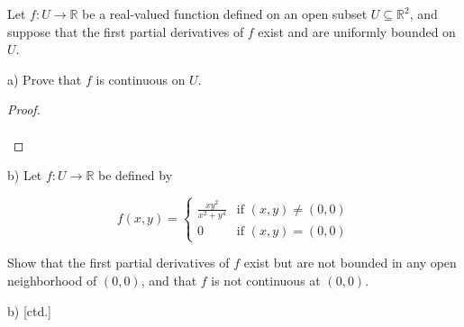 Let $f:U \to \mathbb{R}$ be a real-valued function defined on an open subset $U \subseteq \mathbb{R}^2$, and suppose
that the first partial derivatives of $f$ exist and are uniformly bounded on $U$.

a) Prove that $f$ is continuous on $U$.

\begin{proof}\renewcommand{\qedsymbol}{}\ \\\\
\end{proof}

\pagebreak

b) Let $f:U \to \mathbb{R}$ be defined by 

   $$
   f(x, y) = \begin{cases}
     \frac{xy^2}{x^2 + y^4} &\text{if } (x, y) \neq (0, 0) \\
     0                      &\text{if } (x, y) = (0, 0)
   \end{cases} 
   $$

   Show that the first partial derivatives of $f$ exist but are not bounded in any open neighborhood of $(0, 0)$, and
   that $f$ is not continuous at $(0, 0)$.

\pagebreak

b) [ctd.]
